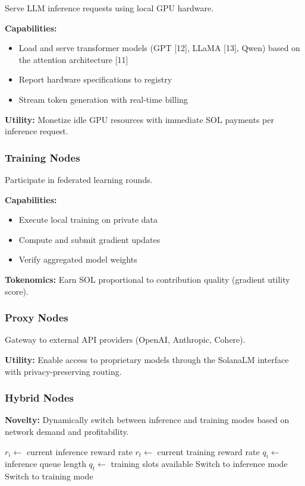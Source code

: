 \documentclass[11pt,a4paper]{article}
\begin{document}
Serve LLM inference requests using local GPU hardware.

\textbf{Capabilities:}
\begin{itemize}
    \item Load and serve transformer models (GPT [12], LLaMA [13], Qwen) based on the attention architecture [11]
    \item Report hardware specifications to registry
    \item Stream token generation with real-time billing
\end{itemize}

\textbf{Utility:} Monetize idle GPU resources with immediate SOL payments per inference request.

\subsubsection{Training Nodes}

Participate in federated learning rounds.

\textbf{Capabilities:}
\begin{itemize}
    \item Execute local training on private data
    \item Compute and submit gradient updates
    \item Verify aggregated model weights
\end{itemize}

\textbf{Tokenomics:} Earn SOL proportional to contribution quality (gradient utility score).

\subsubsection{Proxy Nodes}

Gateway to external API providers (OpenAI, Anthropic, Cohere).

\textbf{Utility:} Enable access to proprietary models through the SolanaLM interface with privacy-preserving routing.

\subsubsection{Hybrid Nodes}

\textbf{Novelty:} Dynamically switch between inference and training modes based on network demand and profitability.

\begin{algorithm}[H]
\caption{Hybrid Node Mode Selection}
\begin{algorithmic}[1]
\State $r_i \gets$ current inference reward rate
\State $r_t \gets$ current training reward rate
\State $q_i \gets$ inference queue length
\State $q_t \gets$ training slots available
    \State Switch to inference mode
\Else
    \State Switch to training mode
\EndIf
\end{algorithmic}
\end{algorithm}
\end{document}
